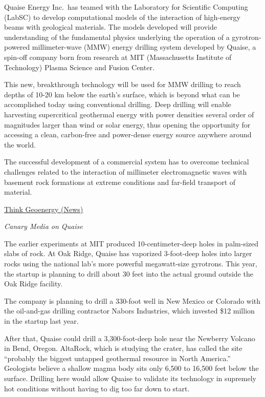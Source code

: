 \documentclass[
]{book}
\begin{document}
Quaise Energy Inc.~has teamed with the Laboratory for Scientific Computing (LabSC) to develop computational models of the interaction of high-energy beams with geological materials.
The models developed will provide understanding of the fundamental physics underlying the operation of a gyrotron-powered millimeter-wave (MMW) energy drilling system developed by Quaise, a spin-off company born from research at MIT (Massachusetts Institute of Technology) Plasma Science and Fusion Center.

This new, breakthrough technology will be used for MMW drilling to reach depths of 10-20 km below the earth's surface, which is beyond what can be accomplished today using conventional drilling.
Deep drilling will enable harvesting supercritical geothermal energy with power densities several order of magnitudes larger than wind or solar energy, thus opening the opportunity for accessing a clean, carbon-free and power-dense energy source anywhere around the world.

The successful development of a commercial system has to overcome technical challenges related to the interaction of millimeter electromagnetic waves with basement rock formations at extreme conditions and far-field transport of material.

\href{https://www.thinkgeoenergy.com/research-partnership-to-explore-ultra-deep-geothermal-drilling/}{Think Geoenergy (News)}

\emph{Canary Media on Quaise}

The earlier experiments at MIT produced 10-centimeter-deep holes in palm-sized slabs of rock. At Oak Ridge, Quaise has vaporized 3-foot-deep holes into larger rocks using the national lab's more powerful megawatt-size gyrotrons. This year, the startup is planning to drill about 30 feet into the actual ground outside the Oak Ridge facility.

The company is planning to drill a 330-foot well in New Mexico or Colorado with the oil-and-gas drilling contractor Nabors Industries, which invested \$12 million in the startup last year.

After that, Quaise could drill a 3,300-foot-deep hole near the Newberry Volcano in Bend, Oregon. AltaRock, which is studying the crater, has called the site \hspace{0pt}``probably the biggest untapped geothermal resource in North America.'' Geologists believe a shallow magma body sits only 6,500 to 16,500 feet below the surface. Drilling here would allow Quaise to validate its technology in supremely hot conditions without having to dig too far down to start.
\end{document}
